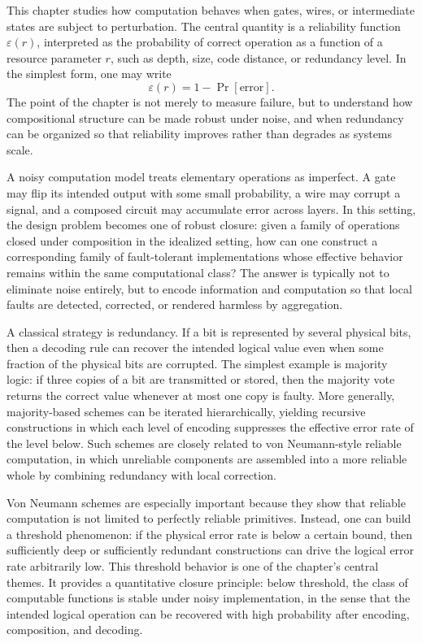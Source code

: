 This chapter studies how computation behaves when gates, wires, or intermediate states are subject to perturbation. The central quantity is a reliability function \(\varepsilon(r)\), interpreted as the probability of correct operation as a function of a resource parameter \(r\), such as depth, size, code distance, or redundancy level. In the simplest form, one may write
\[
\varepsilon(r) = 1 - \Pr[\text{error}].
\]
The point of the chapter is not merely to measure failure, but to understand how compositional structure can be made robust under noise, and when redundancy can be organized so that reliability improves rather than degrades as systems scale.

A noisy computation model treats elementary operations as imperfect. A gate may flip its intended output with some small probability, a wire may corrupt a signal, and a composed circuit may accumulate error across layers. In this setting, the design problem becomes one of robust closure: given a family of operations closed under composition in the idealized setting, how can one construct a corresponding family of fault-tolerant implementations whose effective behavior remains within the same computational class? The answer is typically not to eliminate noise entirely, but to encode information and computation so that local faults are detected, corrected, or rendered harmless by aggregation.

A classical strategy is redundancy. If a bit is represented by several physical bits, then a decoding rule can recover the intended logical value even when some fraction of the physical bits are corrupted. The simplest example is majority logic: if three copies of a bit are transmitted or stored, then the majority vote returns the correct value whenever at most one copy is faulty. More generally, majority-based schemes can be iterated hierarchically, yielding recursive constructions in which each level of encoding suppresses the effective error rate of the level below. Such schemes are closely related to von Neumann-style reliable computation, in which unreliable components are assembled into a more reliable whole by combining redundancy with local correction.

Von Neumann schemes are especially important because they show that reliable computation is not limited to perfectly reliable primitives. Instead, one can build a threshold phenomenon: if the physical error rate is below a certain bound, then sufficiently deep or sufficiently redundant constructions can drive the logical error rate arbitrarily low. This threshold behavior is one of the chapter's central themes. It provides a quantitative closure principle: below threshold, the class of computable functions is stable under noisy implementation, in the sense that the intended logical operation can be recovered with high probability after encoding, composition, and decoding.

